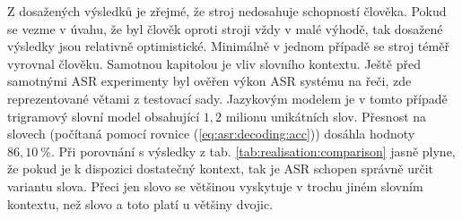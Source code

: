 Z dosažených výsledků je zřejmé, že stroj nedosahuje schopností člověka. Pokud se vezme v úvahu, že byl člověk oproti stroji vždy v malé výhodě, tak dosažené výsledky jsou relativně optimistické. Minimálně v jednom případě se stroj téměř vyrovnal člověku. Samotnou kapitolou je vliv slovního kontextu. Ještě před samotnými ASR experimenty byl ověřen výkon ASR systému na  řeči, zde reprezentované větami z testovací sady. Jazykovým modelem je v tomto případě trigramový slovní model obsahující $1,2$ milionu unikátních slov. Přesnost na slovech (počítaná pomocí rovnice (\ref{eq:asr:decoding:acc})) dosáhla hodnoty $86,10\ \%$. Při porovnání s výsledky z tab. \ref{tab:realisation:comparison} jasně plyne, že pokud je k dispozici dostatečný kontext, tak je ASR schopen správně určit variantu slova. Přeci jen slovo  se většinou vyskytuje v trochu jiném slovním kontextu, než slovo  a toto platí u většiny dvojic.

